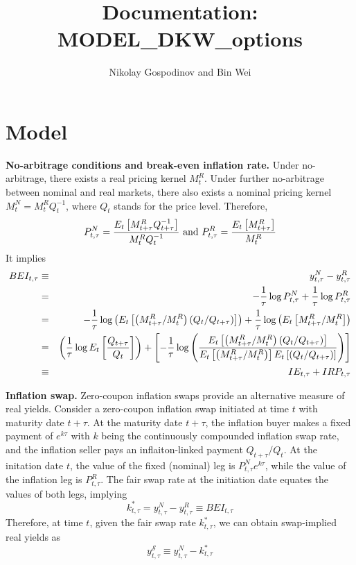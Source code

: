 \documentclass{article}
\begin{document}
\title{Documentation: MODEL\_DKW\_options}
\author{Nikolay Gospodinov and Bin Wei}
\maketitle

\section{Model}

\textbf{No-arbitrage conditions and break-even inflation rate.} Under
no-arbitrage, there exists a real pricing kernel $M_{t}^{R}$. Under further
no-arbitrage between nominal and real markets, there also exists a nominal
pricing kernel $M_{t}^{N}=M_{t}^{R}Q_{t}^{-1}$, where $Q_{t}$ stands for the
price level. Therefore,%
\begin{equation*}
P_{t,\tau }^{N}=\frac{E_{t}\left[ M_{t+\tau }^{R}Q_{t+\tau }^{-1}\right] }{%
M_{t}^{R}Q_{t}^{-1}}\text{ and }P_{t,\tau }^{R}=\frac{E_{t}\left[ M_{t+\tau
}^{R}\right] }{M_{t}^{R}}
\end{equation*}%
It implies%
\begin{eqnarray*}
BEI_{t,\tau } &\equiv &y_{t,\tau }^{N}-y_{t,\tau }^{R} \\
&=&-\frac{1}{\tau }\log P_{t,\tau }^{N}+\frac{1}{\tau }\log P_{t,\tau }^{R}
\\
&=&-\frac{1}{\tau }\log \left( E_{t}\left[ \left( M_{t+\tau
}^{R}/M_{t}^{R}\right) \left( Q_{t}/Q_{t+\tau }\right) \right] \right) +%
\frac{1}{\tau }\log \left( E_{t}\left[ M_{t+\tau }^{R}/M_{t}^{R}\right]
\right)  \\
&=&\left( \frac{1}{\tau }\log E_{t}\left[ \frac{Q_{t+\tau }}{Q_{t}}\right]
\right) +\left[ -\frac{1}{\tau }\log \left( \frac{E_{t}\left[ \left(
M_{t+\tau }^{R}/M_{t}^{R}\right) \left( Q_{t}/Q_{t+\tau }\right) \right] }{%
E_{t}\left[ \left( M_{t+\tau }^{R}/M_{t}^{R}\right) \right] E_{t}\left[
\left( Q_{t}/Q_{t+\tau }\right) \right] }\right) \right]  \\
&\equiv &IE_{t,\tau }+IRP_{t,\tau }
\end{eqnarray*}

\textbf{Inflation swap.} Zero-coupon inflation swaps provide an alternative
measure of real yields. Consider a zero-coupon inflation swap initiated at
time $t$ with maturity date $t+\tau $. At the maturity date $t+\tau $, the
inflation buyer makes a fixed payment of $e^{k\tau }$ with $k$ being the
continuously compounded inflation swap rate, and the inflation seller pays
an inflaiton-linked payment $Q_{t+\tau }/Q_{t}$. At the initation date $t$,
the value of the fixed (nominal) leg is $P_{t,\tau }^{N}e^{k\tau }$, while
the value of the inflation leg is $P_{t,\tau }^{R}$. The fair swap rate at
the initiation date equates the values of both legs, implying%
\begin{equation*}
k_{t,\tau }^{\ast }=y_{t,\tau }^{N}-y_{t,\tau }^{R}\equiv BEI_{t,\tau }
\end{equation*}%
Therefore, at time $t$, given the fair swap rate $k_{t,\tau }^{\ast }$, we
can obtain swap-implied real yields as%
\begin{equation*}
y_{t,\tau }^{\mathcal{S}}\equiv y_{t,\tau }^{N}-k_{t,\tau }^{\ast }
\end{equation*}
\end{document}
